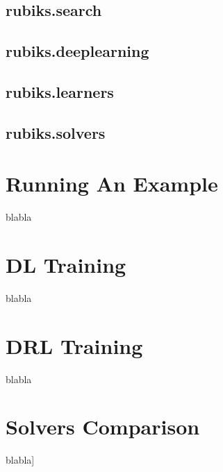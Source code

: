 \subsection{rubiks.search}

\subsection{rubiks.deeplearning}

\subsection{rubiks.learners}

\subsection{rubiks.solvers}


\section{Running An Example}

blabla


\section{DL Training}

blabla
\section{DRL Training}

blabla


\section{Solvers Comparison}

blabla]